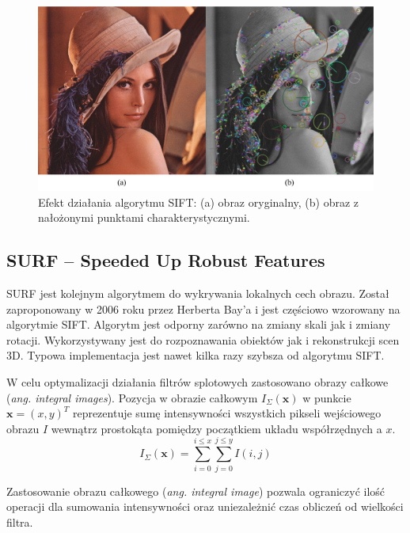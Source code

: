 \begin{figure}[h]
	\centering
	\includegraphics[scale=0.5]{graphics/01_podstawy_teoretyczne/sift-keypoints.pdf}
	\caption{ Efekt działania algorytmu SIFT: (a) obraz oryginalny, (b) obraz z nałożonymi punktami charakterystycznymi. }
	\label{fig:sift-keypoints}
\end{figure}

\subsection{SURF -- Speeded Up Robust Features}

SURF jest kolejnym algorytmem do wykrywania lokalnych cech obrazu. Został zaproponowany w 2006 roku przez Herberta Bay'a i jest częściowo wzorowany na algorytmie SIFT.\cite{BAY08} Algorytm jest odporny zarówno na zmiany skali jak i zmiany rotacji. Wykorzystywany jest do rozpoznawania obiektów jak i rekonstrukcji scen 3D. Typowa implementacja jest nawet kilka razy szybsza od algorytmu SIFT.\cite{SCHWEIGER09}

W celu optymalizacji działania filtrów splotowych zastosowano obrazy całkowe (\emph{ang. integral images}). Pozycja w obrazie całkowym $I_{\Sigma}(\boldsymbol{x})$ w punkcie $\boldsymbol{x}=(x, y)^T$ reprezentuje sumę intensywności wszystkich pikseli wejściowego obrazu $I$ wewnątrz prostokąta pomiędzy początkiem układu współrzędnych a $x$.
\begin{equation} 
\label{surf_integral_image} 
I_{\Sigma}(\boldsymbol{x}) = \sum\limits_{i=0}^{i \leq x} \sum\limits_{j=0}^{j \leq y} I(i,j)
\end{equation}

Zastosowanie obrazu całkowego (\emph{ang. integral image}) pozwala ograniczyć ilość operacji dla sumowania intensywności oraz uniezależnić czas obliczeń od wielkości filtra.\cite{BAY08}

